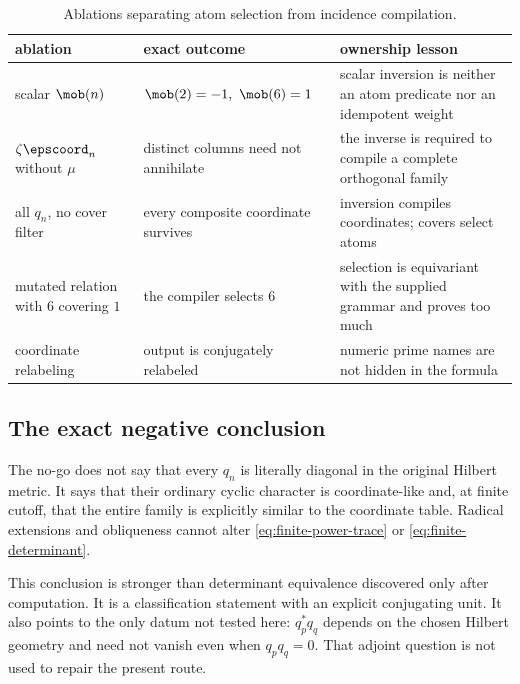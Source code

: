\begin{table}[t]
\centering
\small
\caption{Ablations separating atom selection from incidence compilation.}
\label{tab:algebraic-ablations}
\begin{tabularx}{\textwidth}{L{37mm} L{43mm} Y}
\toprule
ablation & exact outcome & ownership lesson \\
\midrule
scalar \(\mob(n)\)
& \(\mob(2)=-1,\ \mob(6)=1\)
& scalar inversion is neither an atom predicate nor an idempotent weight \\
\(\zeta\epscoord_n\) without \(\mu\)
& distinct columns need not annihilate
& the inverse is required to compile a complete orthogonal family \\
all \(q_n\), no cover filter
& every composite coordinate survives
& inversion compiles coordinates; covers select atoms \\
mutated relation with \(6\) covering \(1\)
& the compiler selects \(6\)
& selection is equivariant with the supplied grammar and proves too much \\
coordinate relabeling
& output is conjugately relabeled
& numeric prime names are not hidden in the formula \\
\bottomrule
\end{tabularx}
\end{table}

\subsection{The exact negative conclusion}

The no-go does not say that every \(q_n\) is literally diagonal in the
original Hilbert metric. It says that their ordinary cyclic character is
coordinate-like and, at finite cutoff, that the entire family is explicitly
similar to the coordinate table. Radical extensions and obliqueness cannot
alter \eqref{eq:finite-power-trace} or \eqref{eq:finite-determinant}.

This conclusion is stronger than determinant equivalence discovered only
after computation. It is a classification statement with an explicit
conjugating unit. It also points to the only datum not tested here:
\(q_p^*q_q\) depends on the chosen Hilbert geometry and need not vanish even
when \(q_pq_q=0\). That adjoint question is not used to repair the present
route.
